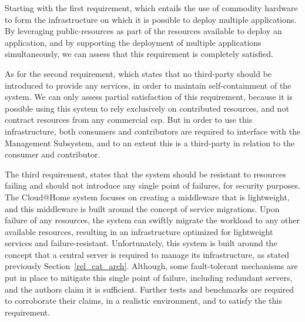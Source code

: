 \documentclass[12pt, titlepage]{uo_temp}
\begin{document}
     Starting with the first requirement, which entails the use of commodity hardware to
     form the infrastructure on which it is possible to deploy multiple applications. By
     leveraging public-resources as part of the resources available to deploy an
     application, and by supporting the deployment of multiple applications
     simultaneously, we can assess that this requirement is completely satisfied.
     
     As for the second requirement, which states that no third-party should be introduced
     to provide any services, in order to maintain self-containment of the system. We can
     only assess partial satisfaction of this requirement, because it is possible using
     this system to rely exclusively on contributed resources, and not contract resources
     from any commercial \gls{csp}. But in order to use this infrastructure, both
     consumers and contributors are required to interface with the Management Subsystem,
     and to an extent this is a third-party in relation to the consumer and contributor.

     The third requirement, states that the system should be resistant to resources
     failing and should not introduce any single point of failures, for security
     purposes. The Cloud@Home system focuses on creating a middleware that is lightweight,
     and this middleware is built around the concept of service migrations. Upon failure
     of any resources, the system can swiftly migrate the workload to any other available
     resources, resulting in an infrastructure optimized for lightweight services and
     failure-resistant. Unfortunately, this system is built around the concept that a
     central server is required to manage its infrastructure, as stated previously
     Section~\ref{rel_cat_arch}. Although, some fault-tolerant mechanisms are put in place
     to mitigate this single point of failure, including redundant servers, and the
     authors claim it is sufficient. Further tests and benchmarks are required to
     corroborate their claims, in a realistic environment, and to satisfy the this
     requirement.
\end{document}
